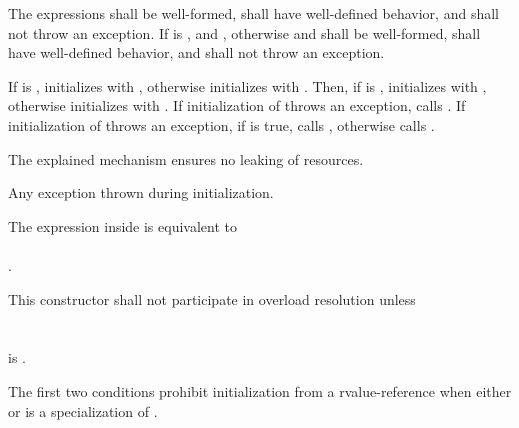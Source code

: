 \documentclass[ebook,11pt,article]{memoir}
\begin{document}
\begin{itemdescr}
\pnum
\requires
The expressions
 shall be well-formed, shall have well-defined behavior, and shall not throw an exception.
If  is ,  and ,
 otherwise  and  shall be well-formed, shall have well-defined behavior, and shall not throw an exception.

\pnum
\effects 
If  is , initializes  with , otherwise initializes  with .
Then, if  is , initializes  with , otherwise initializes  with .
If initialization of  throws an exception, calls .  If initialization of  throws an exception, if  is true, calls , otherwise calls . 
\begin{note}
The explained mechanism ensures no leaking of resources.
\end{note}

\pnum
\throws Any exception thrown during initialization.

\pnum
\remarks
The expression inside  is equivalent to \\
\\.

\pnum
This constructor shall not participate in overload resolution unless\\
 \\
\\
 is .\\
\begin{note}
The first two conditions prohibit initialization from a rvalue-reference when either  or  is a specialization of  .
\end{note}
\end{itemdescr}
\end{document}
